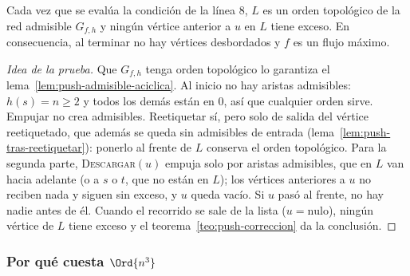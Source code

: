 \documentclass[11pt,letterpaper]{article}
\begin{document}
\begin{teorema}
  \label{teo:reetiquetar-frente}
  Cada vez que se evalúa la condición de la línea 8, $L$ es un orden
  topológico de la red admisible $G_{f,h}$ y ningún vértice anterior a
  $u$ en $L$ tiene exceso. En consecuencia, al terminar no hay
  vértices desbordados y $f$ es un flujo máximo.
\end{teorema}

\begin{proof}[Idea de la prueba]
  Que $G_{f,h}$ tenga orden topológico lo garantiza el
  lema~\ref{lem:push-admisible-aciclica}. Al inicio no hay aristas
  admisibles: $h(s) = n \ge 2$ y todos los demás están en $0$, así que
  cualquier orden sirve. Empujar no crea admisibles. Reetiquetar sí,
  pero solo de salida del vértice reetiquetado, que además se queda
  sin admisibles de entrada (lema~\ref{lem:push-tras-reetiquetar}):
  ponerlo al frente de $L$ conserva el orden topológico. Para la
  segunda parte, \textsc{Descargar}$(u)$ empuja solo por aristas
  admisibles, que en $L$ van hacia adelante (o a $s$ o $t$, que no
  están en $L$); los vértices anteriores a $u$ no reciben nada y
  siguen sin exceso, y $u$ queda vacío. Si $u$ pasó al frente, no hay
  nadie antes de él. Cuando el recorrido se sale de la lista
  ($u = \text{nulo}$), ningún vértice de $L$ tiene exceso y el
  teorema~\ref{teo:push-correccion} da la conclusión.
\end{proof}

\subsubsection*{Por qué cuesta $\Ord{n^3}$}
\end{document}
